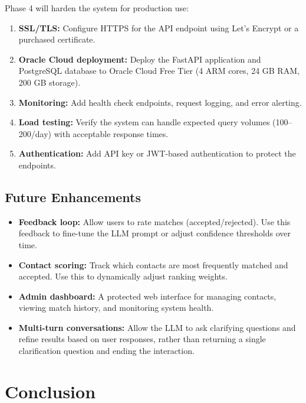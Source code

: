 \documentclass[12pt, a4paper]{report}
\begin{document}
Phase 4 will harden the system for production use:

\begin{enumerate}[itemsep=3pt]
    \item \textbf{SSL/TLS:} Configure HTTPS for the API endpoint using Let's Encrypt or a purchased certificate.
    \item \textbf{Oracle Cloud deployment:} Deploy the FastAPI application and PostgreSQL database to Oracle Cloud Free Tier (4 ARM cores, 24 GB RAM, 200 GB storage).
    \item \textbf{Monitoring:} Add health check endpoints, request logging, and error alerting.
    \item \textbf{Load testing:} Verify the system can handle expected query volumes (100--200/day) with acceptable response times.
    \item \textbf{Authentication:} Add API key or JWT-based authentication to protect the endpoints.
\end{enumerate}

\section{Future Enhancements}

\begin{itemize}[itemsep=3pt]
    \item \textbf{Feedback loop:} Allow users to rate matches (accepted/rejected). Use this feedback to fine-tune the LLM prompt or adjust confidence thresholds over time.
    \item \textbf{Contact scoring:} Track which contacts are most frequently matched and accepted. Use this to dynamically adjust ranking weights.
    \item \textbf{Admin dashboard:} A protected web interface for managing contacts, viewing match history, and monitoring system health.
    \item \textbf{Multi-turn conversations:} Allow the LLM to ask clarifying questions and refine results based on user responses, rather than returning a single clarification question and ending the interaction.
\end{itemize}

\chapter{Conclusion}
\end{document}

